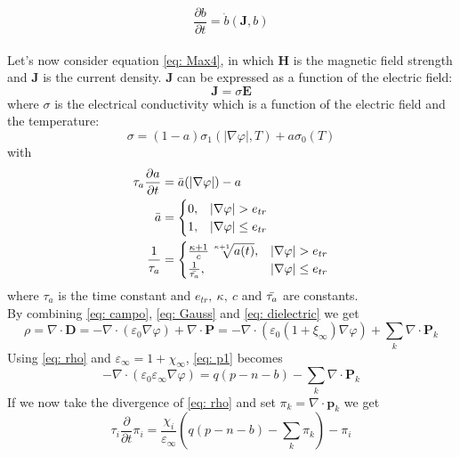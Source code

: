 \documentclass{Configuration_Files/PoliMi3i_thesis}
\let\phi\varphi
\let\epsilon\varepsilon
\begin{document}
\begin{equation}
    \label{eq: b}
    \frac{\partial b}{\partial t}=\Dot{b}(\bm{J},b)
\end{equation}
\\Let's now consider equation \ref{eq: Max4}, in which $\bm{H}$ is the magnetic field strength and $\bm{J}$ is the current density. $\bm{J}$ can be expressed as a function of the electric field:
\begin{equation}
    \label{eq: J}
    \bm{J}=\sigma\bm{E}
\end{equation}
where $\sigma$ is the electrical conductivity which is a function of the electric field and the temperature:
\begin{equation}
    \label{eq: sigma}
    \sigma=(1-a)\sigma_1(|\nabla\phi|,T)+a\sigma_0(T)
\end{equation}
with
\begin{align}
    \tau_a\frac{\partial a}{\partial t} &= \Bar{a}(|\nabla\phi|)-a \label{eq: tau_a} \\
    \Bar{a}&=\begin{cases}0,& |\nabla\phi|>e_{tr}\\1,& |\nabla\phi|\le e_{tr}\end{cases} \\
    \frac{1}{\tau_a}&=\begin{cases}\frac{\kappa+1}{c}\sqrt[\leftroot{-2}\uproot{2}\kappa+1]{a(t)},& |\nabla\phi|>e_{tr}\\ \frac{1}{\Bar{\tau_a}},& |\nabla\phi|\le e_{tr}\end{cases}
\end{align}
where $\tau_a$ is the time constant and $e_{tr},\ \kappa,\ c$ and $\Bar{\tau_a}$ are constants.
\\By combining \ref{eq: campo}, \ref{eq: Gauss} and \ref{eq: dielectric} we get
\begin{equation}
    \label{eq: p1}
    \rho=\nabla\cdot\bm{D}=-\nabla\cdot(\epsilon_0\nabla\phi)+\nabla\cdot\bm{P}=-\nabla\cdot(\epsilon_0(1+\xi_\infty)\nabla\phi)+\sum_k\nabla\cdot\bm{P}_k
\end{equation}
Using \ref{eq: rho} and $\epsilon_\infty=1+\chi_\infty$, \ref{eq: p1} becomes 
\begin{equation}
    \label{eq: p2}
    -\nabla\cdot(\epsilon_0\epsilon_\infty\nabla\phi)=q(p-n-b)-\sum_k\nabla\cdot\bm{P}_k
\end{equation}
If we now take the divergence of \ref{eq: rho} and set $\pi_k=\nabla\cdot\bm{p}_k$ we get
\begin{equation}
    \label{eq: p3}
    \tau_i\frac{\partial}{\partial t}\pi_i=\frac{\chi_i}{\epsilon_\infty}\left(q(p-n-b)-\sum_k\pi_k\right)-\pi_i
\end{equation}
\end{document}
